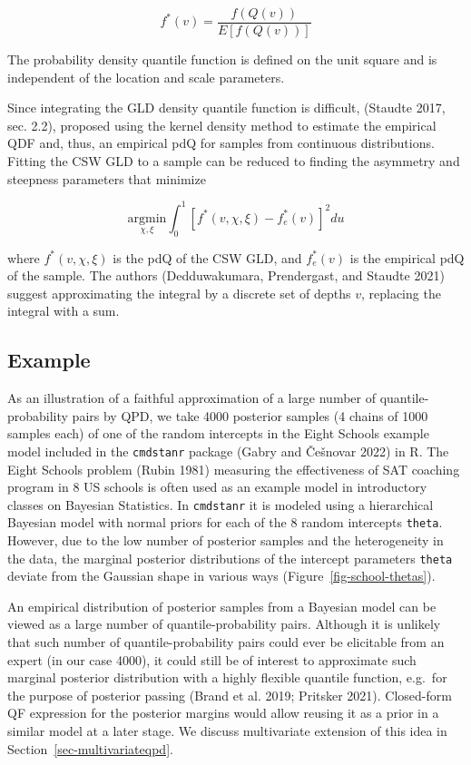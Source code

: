 \documentclass[
]{interact}
\begin{document}
\[
f^*(v)=\frac{f(Q(v))}{E\left[f(Q(v))\right]}
\]

The probability density quantile function is defined on the unit square
and is independent of the location and scale parameters.

Since integrating the GLD density quantile function is difficult,
(Staudte 2017, sec. 2.2), proposed using the kernel density method to
estimate the empirical QDF and, thus, an empirical pdQ for samples from
continuous distributions. Fitting the CSW GLD to a sample can be reduced
to finding the asymmetry and steepness parameters that minimize

\[
\underset{\chi,\xi}{\text{argmin}}\int_0^1\left[f^*(v, \chi, \xi)-f_{e}^*(v)\right]^2du
\]

where \(f^*(v,\chi,\xi)\) is the pdQ of the CSW GLD, and \(f^*_e(v)\) is
the empirical pdQ of the sample. The authors (Dedduwakumara,
Prendergast, and Staudte 2021) suggest approximating the integral by a
discrete set of depths \(v\), replacing the integral with a sum.

\subsection{Example}\label{sec-qmexample}

As an illustration of a faithful approximation of a large number of
quantile-probability pairs by QPD, we take 4000 posterior samples (4
chains of 1000 samples each) of one of the random intercepts in the
Eight Schools example model included in the \texttt{cmdstanr} package
(Gabry and Češnovar 2022) in R. The Eight Schools problem (Rubin 1981)
measuring the effectiveness of SAT coaching program in 8 US schools is
often used as an example model in introductory classes on Bayesian
Statistics. In \texttt{cmdstanr} it is modeled using a hierarchical
Bayesian model with normal priors for each of the 8 random intercepts
\texttt{theta}. However, due to the low number of posterior samples and
the heterogeneity in the data, the marginal posterior distributions of
the intercept parameters \texttt{theta} deviate from the Gaussian shape
in various ways (Figure~\ref{fig-school-thetas}).

An empirical distribution of posterior samples from a Bayesian model can
be viewed as a large number of quantile-probability pairs. Although it
is unlikely that such number of quantile-probability pairs could ever be
elicitable from an expert (in our case 4000), it could still be of
interest to approximate such marginal posterior distribution with a
highly flexible quantile function, e.g.~for the purpose of posterior
passing (Brand et al. 2019; Pritsker 2021). Closed-form QF expression
for the posterior margins would allow reusing it as a prior in a similar
model at a later stage. We discuss multivariate extension of this idea
in Section~\ref{sec-multivariateqpd}.
\end{document}
